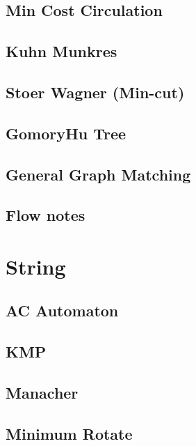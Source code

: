 \subsection{Min Cost Circulation}

\subsection{Kuhn Munkres}

\subsection{Stoer Wagner (Min-cut)}

\subsection{GomoryHu Tree}

\subsection{General Graph Matching}

\subsection{Flow notes}
%



\section{String}
\subsection{AC Automaton}

\subsection{KMP}

\subsection{Manacher}

\subsection{Minimum Rotate}

